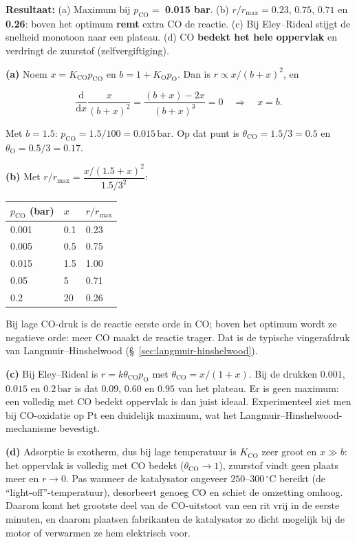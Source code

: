 \begin{oplossing}
\textbf{Resultaat:} (a) Maximum bij \(p_{\mathrm{CO}} =\) \textbf{0.015 bar}. (b) \(r/r_{\max} = 0.23\), \(0.75\), \(0.71\) en \textbf{0.26}: boven het optimum \textbf{remt} extra CO de reactie. (c) Bij Eley--Rideal stijgt de snelheid monotoon naar een plateau. (d) CO \textbf{bedekt het hele oppervlak} en verdringt de zuurstof (zelfvergiftiging).

\textbf{(a)} Noem \(x = K_{\mathrm{CO}}p_{\mathrm{CO}}\) en \(b = 1 + K_{\mathrm{O}}p_{\mathrm{O}}\). Dan is \(r \propto x/(b + x)^2\), en

\[
\frac{\mathrm{d}}{\mathrm{d}x}\frac{x}{(b+x)^2} = \frac{(b+x) - 2x}{(b+x)^3} = 0 \quad\Rightarrow\quad x = b.
\]

Met \(b = 1.5\): \(p_{\mathrm{CO}} = 1.5/100 = 0.015\,\mathrm{bar}\). Op dat punt is \(\theta_{\mathrm{CO}} = 1.5/3 = 0.5\) en \(\theta_{\mathrm{O}} = 0.5/3 = 0.17\).

\textbf{(b)} Met \(r/r_{\max} = \dfrac{x/(1.5 + x)^2}{1.5/3^2}\):

\begin{center}
\begin{tabular}{lll}
\toprule
\(p_{\mathrm{CO}}\) (bar) & \(x\) & \(r/r_{\max}\) \\
\midrule
0.001 & 0.1 & 0.23 \\
0.005 & 0.5 & 0.75 \\
0.015 & 1.5 & 1.00 \\
0.05 & 5 & 0.71 \\
0.2 & 20 & 0.26 \\
\bottomrule
\end{tabular}
\end{center}

Bij lage CO-druk is de reactie eerste orde in CO; boven het optimum wordt ze negatieve orde: meer CO maakt de reactie trager. Dat is de typische vingerafdruk van Langmuir--Hinshelwood (\S~\ref{sec:langmuir-hinshelwood}).

\textbf{(c)} Bij Eley--Rideal is \(r = k\theta_{\mathrm{CO}}p_{\mathrm{O}}\) met \(\theta_{\mathrm{CO}} = x/(1 + x)\). Bij de drukken \(0.001\), \(0.015\) en \(0.2\,\mathrm{bar}\) is dat \(0.09\), \(0.60\) en \(0.95\) van het plateau. Er is geen maximum: een volledig met CO bedekt oppervlak is dan juist ideaal. Experimenteel ziet men bij CO-oxidatie op Pt een duidelijk maximum, wat het Langmuir--Hinshelwood-mechanisme bevestigt.

\textbf{(d)} Adsorptie is exotherm, dus bij lage temperatuur is \(K_{\mathrm{CO}}\) zeer groot en \(x \gg b\): het oppervlak is volledig met CO bedekt (\(\theta_{\mathrm{CO}} \to 1\)), zuurstof vindt geen plaats meer en \(r \to 0\). Pas wanneer de katalysator ongeveer \(250\)--\(300\,^\circ\mathrm{C}\) bereikt (de ``light-off''-temperatuur), desorbeert genoeg CO en schiet de omzetting omhoog. Daarom komt het grootste deel van de CO-uitstoot van een rit vrij in de eerste minuten, en daarom plaatsen fabrikanten de katalysator zo dicht mogelijk bij de motor of verwarmen ze hem elektrisch voor.
\end{oplossing}


